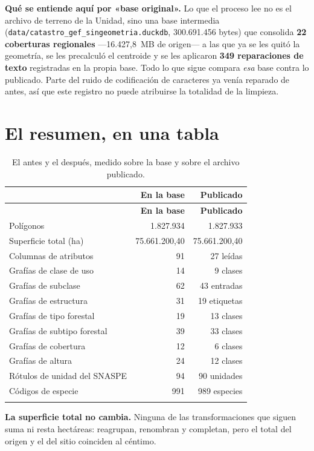 \documentclass[11pt,a4paper]{report}
\newcommand{\campo}[1]{\textcolor{conaf}{\textbf{#1}}}
\newcommand{\orig}[1]{\texttt{\small #1}}
\begin{document}
\begin{nota}
\campo{Qué se entiende aquí por «base original».} Lo que el proceso lee no es el
archivo de terreno de la Unidad, sino una base intermedia
(\orig{data/catastro\_gef\_singeometria.duckdb}, 300.691.456 bytes) que consolida
\textbf{22 coberturas regionales} —16.427,8~MB de origen— a las que ya se les
quitó la geometría, se les precalculó el centroide y se les aplicaron
\textbf{349 reparaciones de texto} registradas en la propia base. Todo lo que
sigue compara \emph{esa} base contra lo publicado. Parte del ruido de
codificación de caracteres ya venía reparado de antes, así que este registro no
puede atribuirse la totalidad de la limpieza.
\end{nota}

\section{El resumen, en una tabla}

\begin{longtable}{@{}L{6.6cm} r r@{}}
\toprule
\textbf{} & \textbf{En la base} & \textbf{Publicado}\\
\midrule
\endfirsthead
\toprule
\textbf{} & \textbf{En la base} & \textbf{Publicado}\\
\midrule
\endhead
Polígonos & 1.827.934 & 1.827.933\\
Superficie total (ha) & 75.661.200,40 & 75.661.200,40\\
Columnas de atributos & 91 & 27 leídas\\
Grafías de clase de uso & 14 & 9 clases\\
Grafías de subclase & 62 & 43 entradas\\
Grafías de estructura & 31 & 19 etiquetas\\
Grafías de tipo forestal & 19 & 13 clases\\
Grafías de subtipo forestal & 39 & 33 clases\\
Grafías de cobertura & 12 & 6 clases\\
Grafías de altura & 24 & 12 clases\\
Rótulos de unidad del SNASPE & 94 & 90 unidades\\
Códigos de especie & 991 & 989 especies\\
\bottomrule
\caption{El antes y el después, medido sobre la base y sobre el archivo publicado.}
\end{longtable}

\begin{nota}
\campo{La superficie total no cambia.} Ninguna de las transformaciones que
siguen suma ni resta hectáreas: reagrupan, renombran y completan, pero el total
del origen y el del sitio coinciden al céntimo.
\end{nota}
\end{document}
